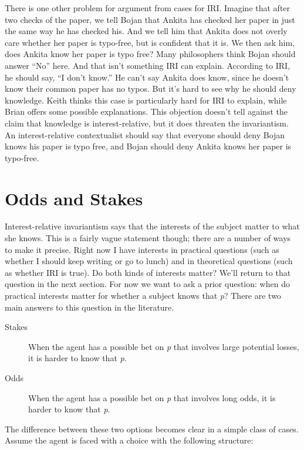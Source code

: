 There is one other problem for argument from cases for IRI. Imagine that after two checks of the paper, we tell Bojan that Ankita has checked her paper in just the same way he has checked his. And we tell him that Ankita does not overly care whether her paper is typo-free, but is confident that it is. We then ask him, does Ankita know her paper is typo free? Many philosophers think Bojan should answer ``No'' here. And that isn't something IRI can explain. According to IRI, he should say, ``I don't know.'' He can't say Ankita does know, since he doesn't know their common paper has no typos. But it's hard to see why he should deny knowledge. Keith  \citet[185]{DeRose2009} thinks this case is particularly hard for IRI to explain, while Brian  \citet{Kim2015} offers some possible explanations. This objection doesn't tell against the claim that knowledge is interest-relative, but it does threaten the invariantism. An interest-relative contextualist should say that everyone should deny Bojan knows his paper is typo free, and Bojan should deny Ankita knows her paper is typo-free.

\section{Odds and Stakes}
\label{oddsandstakes}

Interest-relative invariantism says that the interests of the subject matter to what she knows. This is a fairly vague statement though; there are a number of ways to make it precise. Right now I have interests in practical questions (such as whether I should keep writing or go to lunch) and in theoretical questions (such as whether IRI is true). Do both kinds of interests matter? We'll return to that question in the next section. For now we want to ask a prior question: when do practical interests matter for whether a subject knows that \emph{p}? There are two main answers to this question in the literature.

\begin{description}

\item[Stakes]

When the agent has a possible bet on \emph{p} that involves large potential losses, it is harder to know that \emph{p}.

\item[Odds]

When the agent has a possible bet on \emph{p} that involves long odds, it is harder to know that \emph{p}.
\end{description}
The difference between these two options becomes clear in a simple class of cases. Assume the agent is faced with a choice with the following structure:

